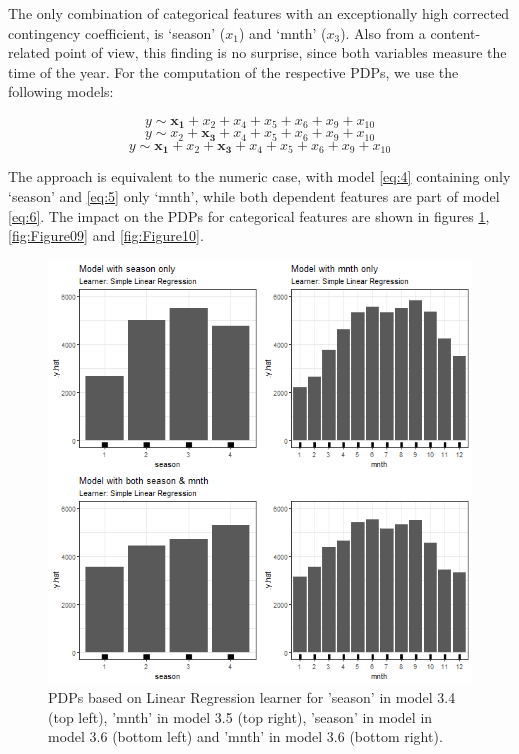 \documentclass[
]{krantz}
\begin{document}
The only combination of categorical features with an exceptionally high corrected contingency coefficient, is `season' (\(x_1\)) and `mnth' (\(x_3\)). Also from a content-related point of view, this finding is no surprise, since both variables measure the time of the year. For the computation of the respective PDPs, we use the following models:

\begin{equation} 
y \sim \mathbf{x_1} + x_2 + x_4 + x_5 + x_6 + x_9 + x_{10} \label{eq:4}
\end{equation}
\begin{equation}
y \sim x_2 +\mathbf{x_3} + x_4 + x_5 + x_6 + x_9 + x_{10} \label{eq:5}
\end{equation}
\begin{equation}
y \sim \mathbf{x_1} + x_2 + \mathbf{x_3} + x_4 + x_5 + x_6 + x_9 + x_{10} \label{eq:6}
\end{equation}

The approach is equivalent to the numeric case, with model \eqref{eq:4} containing only `season' and \eqref{eq:5} only `mnth', while both dependent features are part of model \eqref{eq:6}. The impact on the PDPs for categorical features are shown in figures \ref{fig:Figure08}, \ref{fig:Figure09} and \ref{fig:Figure10}.

\begin{figure}

{\centering \includegraphics[width=0.8\linewidth]{images/VK_PDP_8_Correlated_categorical_LM} 

}

\caption{PDPs based on Linear Regression learner for 'season' in model 3.4 (top left), 'mnth' in model 3.5 (top right), 'season' in model in model 3.6 (bottom left) and 'mnth' in model 3.6 (bottom right).}\label{fig:Figure08}
\end{figure}
\end{document}
